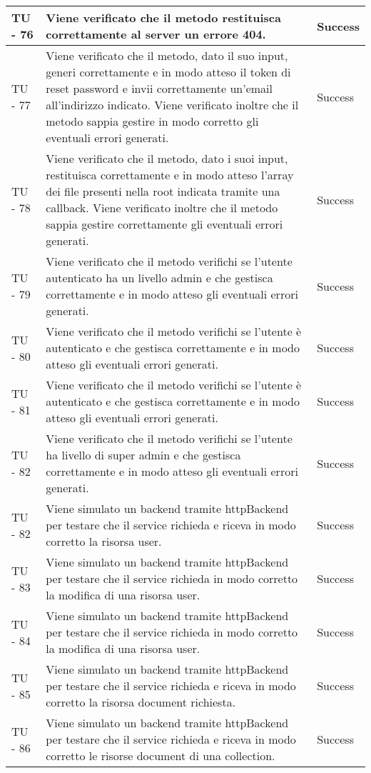 \begin{center}
\begin{longtable}{ | p{3cm} | p{9cm} | p{2cm} | }
TU - 76 & Viene verificato che il metodo restituisca correttamente al server un errore 404. & Success \\ \hline
TU - 77 & Viene verificato che il metodo, dato il suo input, generi correttamente e in modo atteso il token di reset password e invii correttamente un'email all'indirizzo indicato. Viene verificato inoltre che il metodo sappia gestire in modo corretto gli eventuali errori generati. & Success \\ \hline
TU - 78 & Viene verificato che il metodo, dato i suoi input, restituisca correttamente e in modo atteso l'array dei file presenti nella root indicata tramite una callback. Viene verificato inoltre che il metodo sappia gestire correttamente gli eventuali errori generati. & Success \\ \hline
TU - 79 & Viene verificato che il metodo verifichi se l'utente autenticato ha un livello admin e che gestisca correttamente e in modo atteso gli eventuali errori generati. & Success \\ \hline
TU - 80 & Viene verificato che il metodo verifichi se l'utente è autenticato e che gestisca correttamente e in modo atteso gli eventuali errori generati. & Success \\ \hline
TU - 81 & Viene verificato che il metodo verifichi se l'utente è autenticato e che gestisca correttamente e in modo atteso gli eventuali errori generati. & Success \\ \hline
TU - 82 & Viene verificato che il metodo verifichi se l'utente ha livello di super admin e che gestisca correttamente e in modo atteso gli eventuali errori generati. & Success \\ \hline
TU - 82 & Viene simulato un backend tramite httpBackend per testare che il service richieda e riceva in modo corretto la risorsa user. & Success \\ \hline
TU - 83 & Viene simulato un backend tramite httpBackend per testare che il service richieda in modo corretto la modifica di una risorsa user. & Success \\ \hline
TU - 84 & Viene simulato un backend tramite httpBackend per testare che il service richieda in modo corretto la modifica di una risorsa user. & Success \\ \hline
TU - 85 & Viene simulato un backend tramite httpBackend per testare che il service richieda e riceva in modo corretto la risorsa document richiesta. & Success \\ \hline
TU - 86 & Viene simulato un backend tramite httpBackend per testare che il service richieda e riceva in modo corretto le risorse document di una collection. & Success \\ \hline

\end{longtable}
\end{center}
